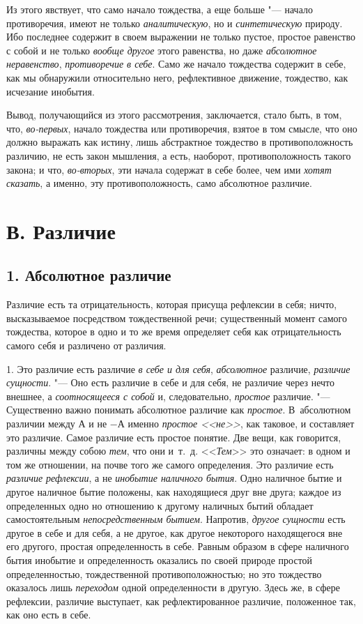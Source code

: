 Из этого явствует, что само начало тождества, а еще больше "--- начало
противоречия, имеют не только {\em аналитическую}, но и
{\em синтетическую} природу. Ибо последнее содержит в
своем выражении не только пустое, простое равенство с собой и не только
{\em вообще другое} этого равенства, но даже
{\em абсолютное неравенство},
{\em противоречие в себе}. Само же начало тождества
содержит в себе, как мы обнаружили относительно него, рефлективное
движение, тождество, как исчезание инобытия.

Вывод, получающийся из этого рассмотрения, заключается, стало быть, в том,
что, {\em во-первых}, начало тождества или
противоречия, взятое в том смысле, что оно должно выражать как истину, лишь
абстрактное тождество в противоположность различию, не есть закон мышления,
а есть, наоборот, противоположность такого закона; и что,
{\em во-вторых}, эти начала содержат в себе более, чем
ими {\em хотят сказать}, а именно, эту
противоположность, само абсолютное различие.

\section[В. Различие]{В. Различие}
\subsection[1. Абсолютное различие]{1. Абсолютное различие}
Различие есть та отрицательность, которая
присуща рефлексии в себя; ничто, высказываемое посредством тождественной
речи; существенный момент самого тождества, которое в одно и то же время
определяет себя как отрицательность самого себя и различено от различия.

1. Это различие есть различие {\em в себе и для себя},
{\em абсолютное} различие,
{\em различие сущности}. "--- Оно есть различие в себе и
для себя, не различие через нечто внешнее, а
{\em соотносящееся с собой} и, следовательно,
{\em простое }различие. "--- Существенно важно понимать
абсолютное различие как {\em простое}. В~абсолютном
различии между $А$ и не $-А$ именно
{\em простое <<не>>}, как таковое, и составляет это
различие. Самое различие есть простое понятие. Две вещи, как говорится,
различны между собою {\em тем}, что они и~т.~д.
<<{\em Тем}>> это означает: в одном и том же отношении,
на почве того же самого определения. Это различие есть
{\em различие рефлексии}, а не
{\em инобытие наличного бытия}. Одно наличное бытие и
другое наличное бытие положены, как находящиеся друг вне друга; каждое из
определенных одно но отношению к другому наличных бытий обладает
самостоятельным {\em непосредственным бытием}.
Напротив, {\em другое сущности} есть другое в себе и
для себя, а не другое, как другое некоторого находящегося вне его другого,
простая определенность в себе. Равным образом в сфере наличного бытия
инобытие и определенность оказались по своей природе простой
определенностью, тождественной противоположностью; но это тождество
оказалось лишь {\em переходом} одной определенности в
другую. Здесь же, в сфере рефлексии, различие выступает, как
рефлектированное различие, положенное так, как оно есть в себе.

